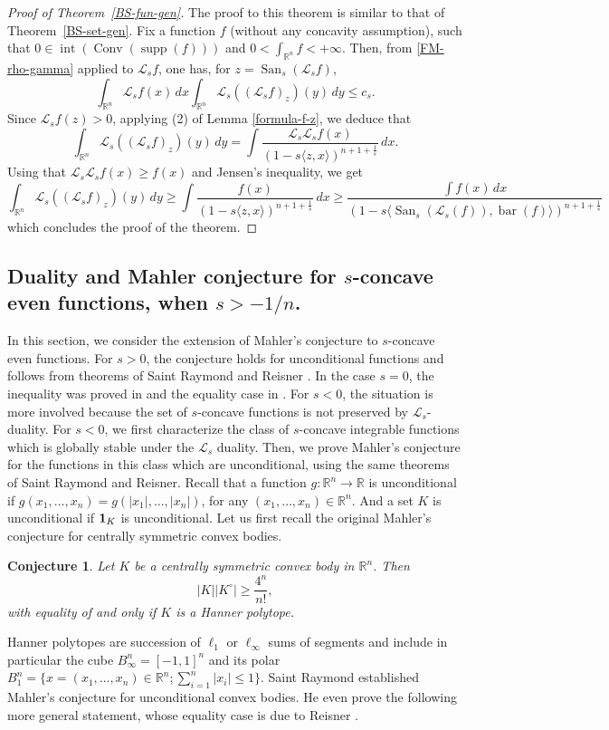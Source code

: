 \documentclass[10pt]{amsart}
\newtheorem{conj}[thm]{Conjecture}
\theoremstyle{definition}
\theoremstyle{remark}
\newcommand{\R}{\mathbb{R}}
\renewcommand{\L}{\mathcal{L}}
\newcommand{\conv}{\operatorname{Conv}}
\newcommand{\inte}{\operatorname{int}}
\newcommand{\supp}{\operatorname{supp}}
\newcommand{\bary}{\operatorname{bar}}
\newcommand{\san}{\operatorname{San}}
\begin{document}
\begin{proof}[Proof of Theorem~\ref{BS-fun-gen}]
The proof to this theorem is similar to that of Theorem~\ref{BS-set-gen}. Fix a function $f$ (without any concavity assumption), such that $0\in \inte(\conv(\supp(f)))$ and $0 < \int_{\R^n} f < +\infty$. Then, from \eqref{FM-rho-gamma} applied to $\L_s f$, one has, for $z=\san_s(\L_s f)$, 
\[
\int_{\R^n}\L_s f(x)\,dx\int_{\R^n}\L_s ((\L_s f)_z)(y)\,dy\le c_s.
\]
Since $\L_s f(z)>0$, applying (2) of Lemma \ref{formula-f-z}, we deduce that 
\[
\int_{\R^n}\L_s ((\L_s f)_z)(y)\,dy=\int\frac{\L_s\L_s f(x)}{(1-s\langle z,x\rangle)^{n+1+\frac{1}{s}}}\,dx.
\]
Using that $\L_s\L_s f(x)\ge f(x)$ and Jensen's inequality, we get
\[
\int_{\R^n}\L_s ((\L_s f)_z)(y)\,dy\ge\int\frac{f(x)}{(1-s\langle z,x\rangle)^{n+1+\frac{1}{s}}}\,dx\ge \frac{\int f(x)\,dx}{(1-s\langle \san_s(\L_s(f)),\bary(f)\rangle)^{n+1+\frac{1}{s}}} 
\]
which concludes the proof of the theorem.
\end{proof}
\subsection{Duality and Mahler conjecture for $s$-concave even functions, when $s>-1/n$.}

In this section, we consider the extension of Mahler's conjecture \cite{Mah39a, Mah39b} to $s$-concave even functions. For $s>0$, the conjecture holds for unconditional functions and  follows from theorems of Saint Raymond \cite{sr81} and Reisner \cite{R87}. In the case $s=0$, the inequality was proved in \cite{fm08a, fm08b} and the equality case in \cite{fgmr10}. For $s<0$, the situation is more involved because the set of $s$-concave functions is not preserved by $\L_s$-duality. For $s<0$, we first characterize the class of $s$-concave integrable functions which is globally stable under the $\L_s$ duality. Then, we prove Mahler's conjecture for the functions in this class which are unconditional, using the same theorems of Saint Raymond and Reisner. 
Recall that a function $g:\R^n\to\R$ is unconditional if
$g(x_1,\dots, x_n)=g(|x_1|,\dots,|x_n|)$, for any $(x_1,\dots,x_n)\in\R^n$. And a set $K$ is unconditional if ${\bf 1}_K$ is unconditional. Let us first recall the original Mahler's conjecture for centrally symmetric convex bodies.

\begin{conj}\label{mahler} Let $K$ be a centrally symmetric convex body in $\R^n$. Then 
$$
|K||K^\circ|\ge \frac{4^n}{n!},
$$ 
with equality of and only if $K$ is a Hanner polytope.
\end{conj}
Hanner polytopes are succession of $\ell_1$ or $\ell_\infty$ sums of segments and include in particular the cube $B_\infty^n=[-1,1]^n$ and its polar $B_1^n=\{x=(x_1,\dots,x_n)\in\R^n;\sum_{i=1}^n|x_i|\le1\}$. 
Saint Raymond \cite{sr81} established Mahler's conjecture for unconditional convex bodies. He even prove the following more general statement, whose equality case is due to Reisner \cite{R87}.
\end{document}
